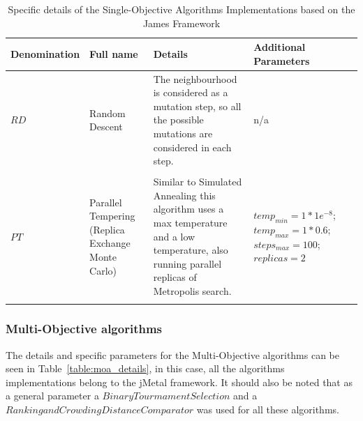 \begin{table}[]
    \begin{tabular}{p{}p{}p{}p{}p{}}
    \hline
    Denomination  & Full name & Details & Additional Parameters 
    \\
    \hline
    $RD$ & Random Descent & The neighbourhood is considered as a mutation step, so all the possible mutations are considered in each step. & n/a \\ \\
    $PT$ & Parallel Tempering (Replica Exchange Monte Carlo) & Similar to Simulated Annealing this algorithm uses a max temperature and a low temperature, also running parallel replicas of Metropolis search.& $temp_{min} = 1 * 1e^{-8}$;$temp_{max} = 1 * 0.6$; $steps_{max} = 100$; $replicas = 2$ \\ \\
    \hline
    \end{tabular}
    \caption{Specific details of the Single-Objective Algorithms Implementations based on the James Framework}
    \label{table:soa_details_james}
\end{table}

\subsubsection{Multi-Objective algorithms}

The details and specific parameters for the Multi-Objective algorithms can be seen in Table~\ref{table:moa_details}, in this case, all the algorithms implementations belong to the jMetal framework. It should also be noted that as a general parameter a $Binary Tourmament Selection$ and a $Ranking and Crowding Distance Comparator$ was used for all these algorithms.

